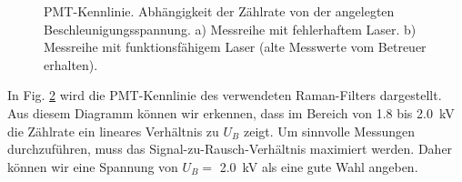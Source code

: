 \documentclass[11pt]{article}
\begin{document}
\begin{figure}[htbp]
    \centering
    \begin{subfigure}{0.45\textwidth}
        \centering
        \caption{}
        \label{fig:fehler}
    \end{subfigure}
    \hfill
    \begin{subfigure}{0.45\textwidth}
        \centering
        \caption{}
        \label{fig:gegeben}
    \end{subfigure}
    \caption{PMT-Kennlinie. Abhängigkeit der Zählrate von der angelegten Beschleunigungsspannung. a) Messreihe mit fehlerhaftem Laser. b) Messreihe mit funktionsfähigem Laser (alte Messwerte vom Betreuer erhalten).}
    \label{fig:PMT_Kennlinie}
\end{figure}

In Fig. \ref{fig:gegeben} wird die PMT-Kennlinie des verwendeten Raman-Filters dargestellt. Aus diesem Diagramm können wir erkennen, dass im Bereich von \num{1.8} bis \SI{2.0}{\kilo\volt} die Zählrate ein lineares Verhältnis zu $U_B$ zeigt. Um sinnvolle Messungen durchzuführen, muss das Signal-zu-Rausch-Verhältnis maximiert werden. Daher können wir eine Spannung von $U_B =$ \SI{2.0}{\kilo\volt} als eine gute Wahl angeben.
\end{document}
